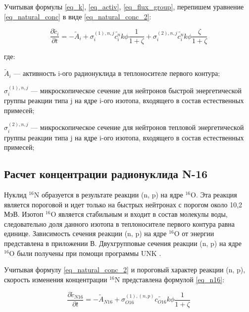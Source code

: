 Учитывая формулы \ref{eq_k}, \ref{eq_activ}, \ref{eq_flux_group}, перепишем уравнение \ref{eq_natural_conc} в виде 
\ref{eq_natural_conc_2}:

\begin{equation}
    \label{eq_natural_conc_2}
    \frac{\partial \widetilde{c}_{i}}{\partial t} = -\widetilde{A}_{i} + \sigma_{i}^{(1), n,j} \widetilde{c_{i}^{n}}
        k \phi \frac{1}{1 + \zeta} + \sigma_{i}^{(2), n,j} \widetilde{c_{i}^{n}} k \phi \frac{\zeta}{1 + \zeta}
\end{equation}

где:
\begin{description}
    \item $\widetilde{A}_{i}$ --- активность i-ого радионуклида в теплоносителе первого контура;
    \item $\sigma_{i}^{(1), n,j}$ --- микроскопическое сечение для нейтронов быстрой энергетической группы реакции типа 
        j на ядре i-ого изотопа, входящего в состав естественных примесей;
    \item $\sigma_{i}^{(2), n,j}$ --- микроскопическое сечение для нейтронов тепловой энергетической группы реакции типа 
        j на ядре i-ого изотопа, входящего в состав естественных примесей; 
\end{description}

\subsection{Расчет концентрации радионуклида N-16}

Нуклид $^{16}\text{N}$ образуется в результате реакции (n, p) на ядре $^{16}\text{O}$. Эта реакция является 
пороговой и идет только на быстрых нейтронах с порогом около 10,2 МэВ. Изотоп $^{16}\text{O}$ является стабильным и 
входит в состав молекулы воды, следовательно доля данного изотопа в теплоносителе первого контура равна единице. 
Зависимость сечения реакции (n, p) на ядре $^{16}\text{O}$ от энергии представлена в приложении В. Двухгрупповые 
сечения реакции (n, p) на ядре $^{16}\text{O}$ были получены при помощи программы UNK \cite{unk}.

Учитывая формулу \ref{eq_natural_conc_2} и пороговый характер реакции (n, p), скорость изменения концентрации 
$^{16}\text{N}$ представлена формулой \ref{eq_n16}:

\begin{equation}
    \label{eq_n16}
    \frac{\partial \widetilde{c}_{N16}}{\partial t} = -\widetilde{A}_{N16} + \sigma_{O16}^{(1), (n, p)} \widetilde{c_{O16}}
        k \phi \frac{1}{1 + \zeta}
\end{equation}

